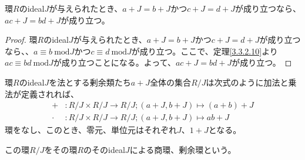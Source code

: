 \documentclass[dvipdfmx]{jsarticle}
\begin{document}
\begin{thm}\label{3.3.2.11}
環$R$のideal$J$が与えられたとき、$a + J = b + J$かつ$c + J = d + J$が成り立つなら、$ac + J = bd + J$が成り立つ。
\end{thm}
\begin{proof}
環$R$のideal$J$が与えられたとき、$a + J = b + J$かつ$c + J = d + J$が成り立つなら、、$a \equiv b\ \mathrm{mod}J $かつ$c \equiv d\ \mathrm{mod}J $が成り立つ。ここで、定理\ref{3.3.2.10}より$ac \equiv bd\ \mathrm{mod}J $が成り立つことになる。よって、$ac + J = bd + J$が成り立つ。
\end{proof}
\begin{thm}\label{3.3.2.12}
環$R$のideal$J$を法とする剰余類たち$a + J$全体の集合${R}/{J}$は次式のように加法と乗法が定義されれば、
\begin{align*}
+ &:{R}/{J} \times {R}/{J} \rightarrow {R}/{J};(a + J,b + J) \mapsto (a + b) + J\\
\cdot &:{R}/{J} \times {R}/{J} \rightarrow {R}/{J};(a + J,b + J) \mapsto ab + J
\end{align*}
環をなし、このとき、零元、単位元はそれぞれ$J$、$1 + J$となる。
\end{thm}
\begin{dfn}
この環${R}/{J}$をその環$R$のそのideal$J$による商環、剰余環という。
\end{dfn}
\end{document}
